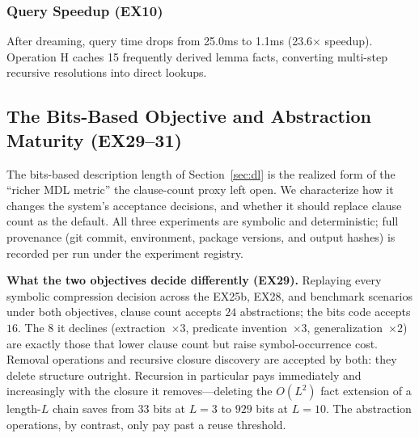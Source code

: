 \documentclass[10pt,conference]{IEEEtran}
\begin{document}
\subsubsection{Query Speedup (EX10)} After dreaming, query time drops from 25.0ms to 1.1ms (23.6$\times$ speedup). Operation H caches 15 frequently derived lemma facts, converting multi-step recursive resolutions into direct lookups.

\subsection{The Bits-Based Objective and Abstraction Maturity (EX29--31)}
\label{sec:bitsdl}

The bits-based description length of Section~\ref{sec:dl} is the realized form of the ``richer MDL metric'' the clause-count proxy left open. We characterize how it changes the system's acceptance decisions, and whether it should replace clause count as the default. All three experiments are symbolic and deterministic; full provenance (git commit, environment, package versions, and output hashes) is recorded per run under the experiment registry.

\textbf{What the two objectives decide differently (EX29).} Replaying every symbolic compression decision across the EX25b, EX28, and benchmark scenarios under both objectives, clause count accepts $24$ abstractions; the bits code accepts $16$. The $8$ it declines (extraction~$\times3$, predicate invention~$\times3$, generalization~$\times2$) are exactly those that lower clause count but raise symbol-occurrence cost. Removal operations and recursive closure discovery are accepted by both: they delete structure outright. Recursion in particular pays immediately and increasingly with the closure it removes---deleting the $O(L^2)$ fact extension of a length-$L$ chain saves from $33$ bits at $L=3$ to $929$ bits at $L=10$. The abstraction operations, by contrast, only pay past a reuse threshold.
\end{document}
